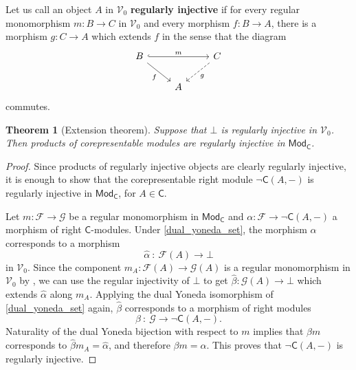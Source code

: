 \documentclass[11pt,onecolumn]{article}
\newcommand{\cV}{\mathscr{V}}
\newcommand{\cC}{\mathsf{C}}
\newcommand{\Mod}{\mathsf{Mod}}
\theoremstyle{plain}
\newtheorem{theorem}{Theorem}[subsection]
\theoremstyle{remark}
\theoremstyle{definition}
\begin{document}
Let us call an object $A$ in $\cV_0$ \textbf{regularly injective} if for every regular monomorphism $m : B \to C$ in $\cV_0$ and every morphism $f : B \to A$,
there is a morphism $g : C \to A$ which extends $f$ in the sense that the diagram
\[
	\begin{tikzcd}
		B \ar[rr, hook, "m"] \ar[dr, "f"'] & & C \ar[dl, dashed, "g"] \\
						   & A 
	\end{tikzcd}
\]
commutes.

\begin{theorem}[Extension theorem]
	\label{extension}
	Suppose that $\bot$ is regularly injective in $\cV_0$.
	Then products of corepresentable modules are regularly injective in $\Mod_{\cC}$.
\end{theorem}

\begin{proof}
	Since products of regularly injective objects are clearly regularly injective, it is enough to show that the corepresentable right module $\neg \cC(A,-)$ is regularly injective in $\Mod_{\cC}$, for $A \in \cC$.

	Let $m : \mathcal{F} \to \mathcal{G}$ be a regular monomorphism in $\Mod_{\cC}$ and $\alpha : \mathcal{F} \longrightarrow \neg \cC(A,-)$ a morphism of right $\cC$-modules.
	Under \eqref{dual_yoneda_set}, the morphism $\alpha$ corresponds to a morphism
	\[
		\widehat\alpha \: : \: \mathcal{F}(A) \longrightarrow \bot
	\]
	in $\cV_0$.
	Since the component $m_A : \mathcal{F}(A) \to \mathcal{G}(A)$ is a regular monomorphism in $\cV_0$ by ,
	we can use the regular injectivity of $\bot$ to get $\widehat\beta : \mathcal{G}(A) \to \bot$ which extends $\widehat\alpha$ along $m_A$.
	Applying the dual Yoneda isomorphism of \eqref{dual_yoneda_set} again, $\widehat\beta$ corresponds to a morphism of right modules
	\[
		\beta \: : \: \mathcal{G} \longrightarrow \neg \cC(A,-).
	\]
	Naturality of the dual Yoneda bijection with respect to $m$ implies that $\beta m$ corresponds to $\widehat\beta m_A = \widehat\alpha$,
	and therefore $\beta m = \alpha$.
	This proves that $\neg \cC(A,-)$ is regularly injective.
\end{proof}
\end{document}
